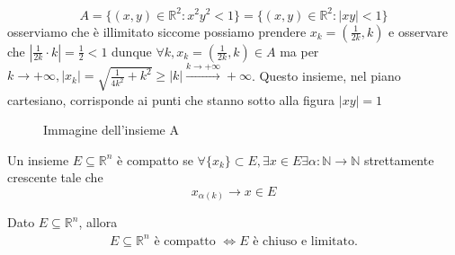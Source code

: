 \begin{example}
$$
A = \{(x, y) \in \mathbb{R}^2: x^2 y^2 < 1 \} = \{ (x, y) \in \mathbb{R}^2 : |xy| < 1 \}
$$
osserviamo che è illimitato siccome possiamo prendere $x_k = (\frac{1}{2k}, k)$ e osservare che $|\frac{1}{2k} \cdot k| = \frac{1}{2} < 1$ dunque $\forall k, x_k = (\frac{1}{2k}, k) \in A$ ma per $k \to +\infty, |x_k| = \sqrt{\frac{1}{4k^2} + k^2} \geq |k| \stackrel{k \to +\infty}{\to} +\infty$. 
Questo insieme, nel piano cartesiano, corrisponde ai punti che stanno sotto alla figura $|xy| = 1$
\begin{figure}[H]
	\centering
	  \caption{Immagine dell'insieme A}
	  \label{fig:set_A}
\end{figure}
\end{example}
\begin{definition}
	Un insieme $E \subseteq \mathbb{R}^n$ è compatto se $\forall \{x_k \} \subset E, \exists x \in E \exists \alpha: \mathbb{N} \to \mathbb{N}$ strettamente crescente tale che
	$$
	x_{\alpha(k)} \to x \in E
	$$
\end{definition}
\begin{theorem}
	Dato $E \subseteq \mathbb{R}^n$, allora 
	\begin{align*}
		E \subseteq \mathbb{R}^n \text{ è compatto } \iff E \text{ è chiuso e limitato.}
	\end{align*}
\end{theorem}
